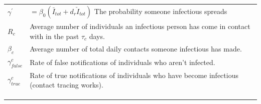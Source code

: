 \documentclass[notitlepage, superscriptaddress]{revtex4-2}
\begin{document}
\begin{table}[]
\begin{tabular}{ll}
$\gamma^{'}$                & $=\beta_{0} (\bar{I}_{tot} + d_{r} \check{I}_{tot})$  The probability someone infectious spreads      \\
$R_{c}$             & Average number of individuals an infectious person has come in contact with in the past $\tau_{c}$ days. \\
$\beta_{c}$                 & Average number of total daily contacts someone infectious has made.                                \\
$\gamma^{c}_{false}$        & Rate of false notifications of individuals who aren't infected.                                    \\
$\gamma^{c}_{true}$ & Rate of true notifications of individuals who have become infectious (contact tracing works).            \\
                            &                                                                                                    \\
                            &                                                                                                    \\
                            &                                                                                                   
\end{tabular}
\end{table}

\end{document}
